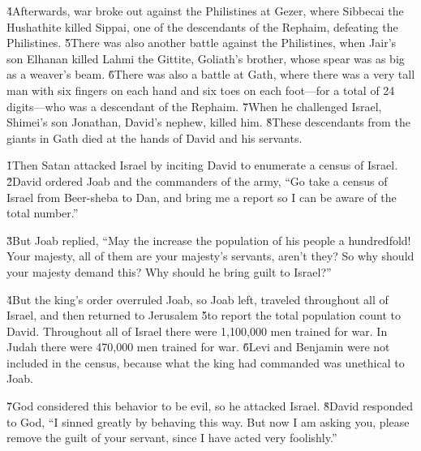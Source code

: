 \v{4}Afterwards, war broke out against the Philistines at Gezer, where Sibbecai the Hushathite killed Sippai, one of the descendants of the Rephaim, defeating the Philistines. \v{5}There was also another battle against the Philistines, when Jair's son Elhanan killed Lahmi the Gittite, Goliath's brother, whose spear was as big as a weaver's beam. \v{6}There was also a battle at Gath, where there was a very tall man with six fingers on each hand and six toes on each foot---for a total of 24 digits---who was a descendant of the Rephaim. \v{7}When he challenged Israel, Shimei's son Jonathan, David's nephew, killed him. \v{8}These descendants from the giants in Gath died at the hands of David and his servants.

\v{1}Then Satan attacked Israel by inciting David to enumerate a census of Israel. \v{2}David ordered Joab and the commanders of the army, ``Go take a census of Israel from Beer-sheba to Dan, and bring me a report so I can be aware of the total number.''

\v{3}But Joab replied, ``May the  increase the population of his people a hundredfold! Your majesty, all of them are your majesty's servants, aren't they? So why should your majesty demand this? Why should he bring guilt to Israel?''

\v{4}But the king's order overruled Joab, so Joab left, traveled throughout all of Israel, and then returned to Jerusalem \v{5}to report the total population count to David. Throughout all of Israel there were 1,100,000 men trained for war. In Judah there were 470,000 men trained for war. \v{6}Levi and Benjamin were not included in the census, because what the king had commanded was unethical to Joab.

\v{7}God considered this behavior to be evil, so he attacked Israel. \v{8}David responded to God, ``I sinned greatly by behaving this way. But now I am asking you, please remove the guilt of your servant, since I have acted very foolishly.''

